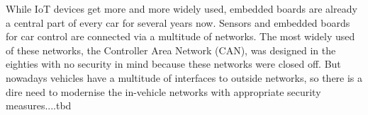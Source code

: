 
While IoT devices get more and more widely used, embedded boards are already a
central part of every car for several years now. Sensors and embedded boards for
car control are connected via a multitude of networks. The most widely used of
these networks, the Controller Area Network (CAN), was designed in the eighties
with no security in mind because these networks were closed off. But nowadays
vehicles have a multitude of interfaces to outside networks, so there is a dire
need to modernise the in-vehicle networks with appropriate security measures....tbd
